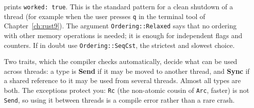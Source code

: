 prints \verb!worked: true!. This is the standard pattern for a clean shutdown of a thread (for example when the user presses \verb!q! in the terminal tool of Chapter~\ref{ch:rust9}). The argument \verb!Ordering::Relaxed! says that no ordering with other memory operations is needed; it is enough for independent flags and counters. If in doubt use \verb!Ordering::SeqCst!, the strictest and slowest choice.
\begin{keyidea}
Two traits, which the compiler checks automatically, decide what can be used across threads: a type is \textbf{Send} if it may be moved to another thread, and \textbf{Sync} if a shared reference to it may be used from several threads. Almost all types are both. The exceptions protect you: \verb!Rc! (the non-atomic cousin of \verb!Arc!, faster) is not \verb!Send!, so using it between threads is a compile error rather than a rare crash.
\end{keyidea}

